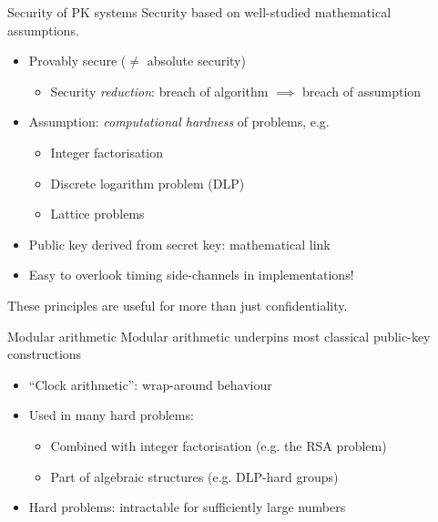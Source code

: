 \begin{frame}{Security of PK systems}
  Security based on well-studied mathematical assumptions.
  \begin{itemize}[<+(1)->]
    \item Provably secure ($\neq$ absolute security)
    \begin{itemize}
      \item Security \emph{reduction}: breach of algorithm $\implies$ breach of assumption
    \end{itemize}
    \item Assumption: \emph{computational hardness} of problems, e.g.
    \begin{itemize}
      \item Integer factorisation
      \item Discrete logarithm problem (DLP)
      \item Lattice problems
    \end{itemize}
    \item Public key derived from secret key: mathematical link
    \item Easy to overlook timing side-channels in implementations!
  \end{itemize}

  \vspace*{1em}

  \pause
  These principles are useful for more than just confidentiality.
\end{frame}

\begin{frame}{Modular arithmetic}
  Modular arithmetic underpins most classical public-key constructions
  \begin{itemize}[<+(1)->]
    \item \enquote{Clock arithmetic}: wrap-around behaviour
    \item Used in many hard problems:
    \begin{itemize}
      \item Combined with integer factorisation (e.g. the RSA problem)
      \item Part of algebraic structures (e.g. DLP-hard groups)
    \end{itemize}
    \item Hard problems: intractable for sufficiently large numbers
  \end{itemize}
\end{frame}

